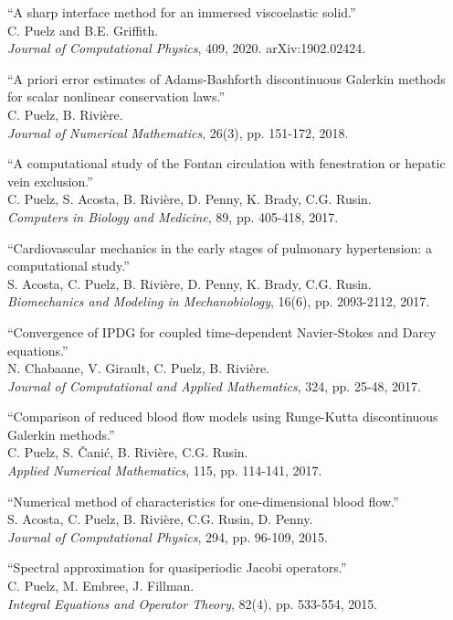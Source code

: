 \documentclass{article} %
\begin{document}
\begin{etaremune}
\item ``A sharp interface method for an immersed viscoelastic  solid.'' \\
C. Puelz and B.E. Griffith.\\
{\em Journal of Computational Physics}, 409, 2020. arXiv:1902.02424.
\item ``A priori error estimates of Adams-Bashforth discontinuous Galerkin methods \\for scalar nonlinear conservation laws.'' \\
C. Puelz, B. Rivi\`ere. \\
{\em Journal of Numerical Mathematics}, 26(3), pp. 151-172, 2018.
\item ``A computational study of the Fontan circulation with fenestration or hepatic vein exclusion.'' \\
C. Puelz, S. Acosta, B. Rivi\`ere,  D. Penny, K. Brady, C.G. Rusin.\\ {\em Computers in Biology and Medicine}, 89, pp. 405-418, 2017.
\item ``Cardiovascular mechanics in the early stages of pulmonary hypertension: a computational study.''\\
 S. Acosta, C. Puelz, B. Rivi\`ere,  D. Penny, K. Brady, C.G. Rusin.\\
  {\em Biomechanics and Modeling in Mechanobiology}, 16(6), pp. 2093-2112, 2017.
\item ``Convergence of IPDG for coupled time-dependent Navier-Stokes and Darcy equations.'' \\
N. Chabaane, V. Girault, C. Puelz, B. Rivi\`ere. \\
{\em Journal of Computational and Applied Mathematics}, 324, pp. 25-48, 2017.
\item ``Comparison of reduced blood flow models using Runge-Kutta discontinuous Galerkin methods.''\\
 C. Puelz, S. \v{C}ani\'c, B. Rivi\`ere, C.G. Rusin. \\
 {\em Applied Numerical Mathematics}, 115, pp. 114-141, 2017.
\item ``Numerical method of characteristics for one-dimensional blood flow.'' \\
S. Acosta, C. Puelz, B. Rivi\`ere, C.G. Rusin, D. Penny. \\
{\em Journal of Computational Physics}, 294, pp. 96-109, 2015.
\item ``Spectral approximation for quasiperiodic Jacobi operators.''\\
 C. Puelz, M. Embree, J. Fillman. \\
 {\em Integral Equations and Operator Theory}, 82(4), pp. 533-554, 2015.
\end{etaremune}
\end{document}
